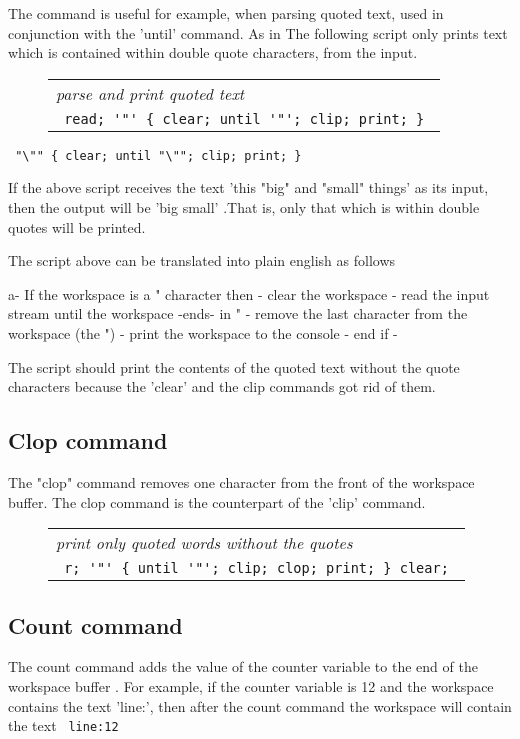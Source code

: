\documentclass[a4paper,12pt]{article}
\begin{document}
 The command is useful for example, when parsing quoted text, used in
 conjunction with the 'until' command. As in The following script only prints
 text which is contained within double quote characters, from the input.
 \begin{figure}
 \begin{tabular}{ l }
 \emph{ parse and print quoted text } \\ 
 \verb| read; '"' { clear; until '"'; clip; print; } |
 \end{tabular} 
 \end{figure} 
 \verb| "\"" { clear; until "\""; clip; print; } |


 If the above script receives the text 'this "big" and "small" things'
 as its input, then the output will be 'big small' .That is, only
 that which is within double quotes will be printed.

The script above can be translated into plain english as follows

 a- If the workspace is a " character then
  - clear the workspace
  - read the input stream until the workspace -ends- in "
  - remove the last character from the workspace (the ")
  - print the workspace to the console
  - end if
  -

 The script should print the contents of the quoted text
 without the quote characters because the 'clear' and
 the clip commands got rid of them.

\subsection{Clop command}

  The "clop" command removes one character from the front
  of the workspace buffer. The clop command is the counterpart of
  the 'clip' command.
 \begin{figure}
 \begin{tabular}{ l }
 \emph{ print only quoted words without the quotes } \\ 
 \verb| r; '"' { until '"'; clip; clop; print; } clear; |
 \end{tabular} 
 \end{figure}

\subsection{Count command}

 The count command adds the value of the counter variable
 to the end of the workspace buffer . For example, if the counter variable
 is 12 and the workspace contains the text 'line:', then after the
 count command the workspace will contain the text 
 \verb| line:12 |
\end{document}
